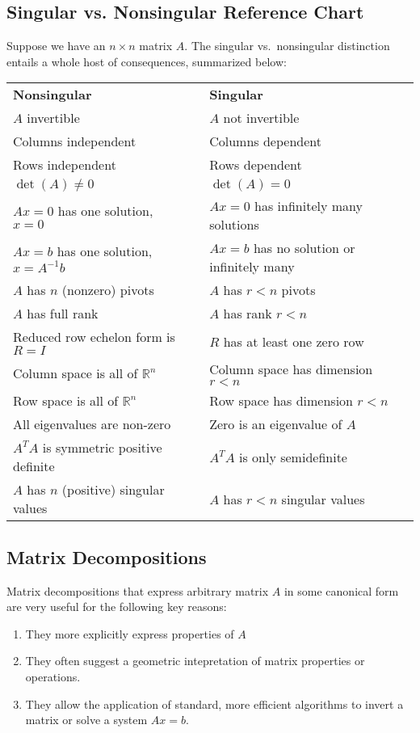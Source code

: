 \documentclass[12pt]{article}
\numberwithin{equation}{section} %
\theoremstyle{plain}
\theoremstyle{definition}
\theoremstyle{remark}
\begin{document}
\subsection{Singular vs. Nonsingular Reference Chart}

Suppose we have an $n\times n$ matrix $A$. The singular vs.\ nonsingular
distinction entails a whole host of consequences, summarized below:
\begin{table}[h!]
\centering
\begin{tabular}{lll}
\textbf{Nonsingular}                     && \textbf{Singular} \\
$A$ invertible                           && $A$ not invertible \\
Columns independent                      && Columns dependent \\
Rows independent                         && Rows dependent \\
$\det(A)\neq0$                           && $\det(A)=0$ \\
$Ax = 0$ has one solution, $x = 0$       && $Ax=0$ has infinitely many solutions\\
$Ax = b$ has one solution, $x = A^{-1}b$ && $Ax = b$ has no solution or infinitely many \\
$A$ has $n$ (nonzero) pivots             && $A$ has $r<n$ pivots \\
$A$ has full rank                        && $A$ has rank $r<n$ \\
Reduced row echelon form is $R = I$      && $R$ has at least one zero row \\
Column space is all of $\mathbb{R}^n$    && Column space has dimension $r<n$ \\
Row space is all of $\mathbb{R}^n$       && Row space has dimension $r<n$ \\
All eigenvalues are non-zero             && Zero is an eigenvalue of $A$ \\
$A^T A$ is symmetric positive definite   && $A^T A$ is only semidefinite \\
$A$ has $n$ (positive) singular values   && $A$ has $r<n$ singular values
\end{tabular}
\end{table}


\clearpage
\subsection{Matrix Decompositions}
\label{subsec:decomp}

Matrix decompositions that express arbitrary matrix $A$ in some
canonical form are very useful for the following key reasons:
\begin{enumerate}
  \item They more explicitly express properties of $A$
  \item They often suggest a geometric intepretation of matrix
    properties or operations.
  \item They allow the application of standard, more efficient
    algorithms to invert a matrix or solve a system $Ax=b$.
\end{enumerate}
\end{document}
